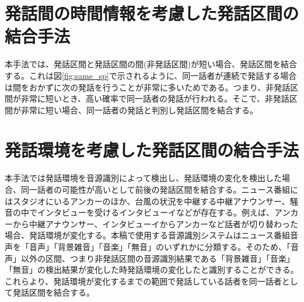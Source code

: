 \section{発話間の時間情報を考慮した発話区間の結合手法}
本手法では、発話区間と発話区間の間(非発話区間)が短い場合、発話区間を結合する。これは図\ref{fig:same_sp}で示されるように、同一話者が連続で発話する場合は間をおかずに次の発話を行うことが非常に多いためである。つまり、非発話区間が非常に短いとき、高い確率で同一話者の発話が行われる。そこで、非発話区間が非常に短い場合、同一話者の発話と判別し発話区間を結合する。

\section{発話環境を考慮した発話区間の結合手法}
本手法では発話環境を音源識別によって検出し、発話環境の変化を検出した場合、同一話者の可能性が高いとして前後の発話区間を結合する。ニュース番組にはスタジオにいるアンカーのほか、台風の状況を中継する中継アナウンサー、騒音の中でインタビューを受けるインタビューイなどが存在する。例えば、アンカーから中継アナウンサー、インタビューイからアンカーなど話者が切り替わった場合、発話環境が変化する。本稿で使用する音源識別システムはニュース番組音声を「音声」「背景雑音」「音楽」「無音」のいずれかに分類する。そのため、「音声」以外の区間、つまり非発話区間の音源識別結果である「背景雑音」「音楽」「無音」の検出結果が変化した時発話環境の変化したと識別することができる。これらより、発話環境が変化するまでの範囲で発話している話者を同一話者として発話区間を結合する。\par
